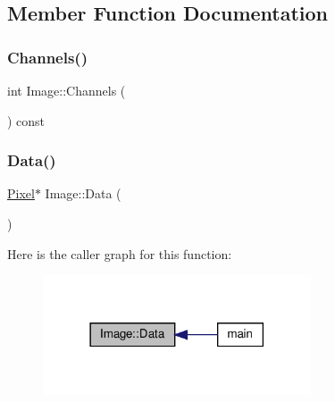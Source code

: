 \subsection{Member Function Documentation}
\mbox{\label{structImage_acd164a8d76fb05eb3f0123b50032b4a4}} 
\subsubsection{\texorpdfstring{Channels()}{Channels()}}
{\footnotesize\ttfamily int Image\+::\+Channels (\begin{DoxyParamCaption}{ }\end{DoxyParamCaption}) const\hspace{0.3cm}{\ttfamily [inline]}}

\mbox{\label{structImage_aad45e088de1f92fde63d3bcd7d542cdd}} 
\subsubsection{\texorpdfstring{Data()}{Data()}}
{\footnotesize\ttfamily \hyperlink{structPixel}{Pixel}$\ast$ Image\+::\+Data (\begin{DoxyParamCaption}{ }\end{DoxyParamCaption})\hspace{0.3cm}{\ttfamily [inline]}}

Here is the caller graph for this function\+:\nopagebreak
\begin{figure}[H]
\begin{center}
\leavevmode
\includegraphics[width=225pt]{structImage_aad45e088de1f92fde63d3bcd7d542cdd_icgraph}
\end{center}
\end{figure}
\mbox{\label{structImage_a0bedb6561074b2cdf3f5a577c80e043a}} 
